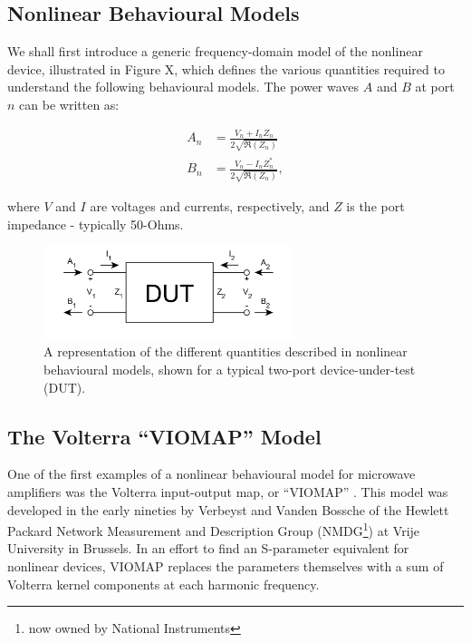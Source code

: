 \documentclass[../thesis/thesis.tex]{subfiles}
\begin{document}
\begin{refsection}
\section{Nonlinear Behavioural Models}

We shall first introduce a generic frequency-domain model of the nonlinear device, illustrated in Figure X, which defines the various quantities required to understand the following behavioural models. The power waves $A$ and $B$ at port $n$ can be written as:

\begin{align}
	A_n &= \frac{V_n + I_n Z_n}{2\sqrt{\Re(Z_n)}} \\
	B_n &= \frac{V_n - I_n Z^*_n}{2\sqrt{\Re(Z_n)}},
\end{align}

where $V$ and $I$ are voltages and currents, respectively, and $Z$ is the port impedance - typically 50-Ohms.

\begin{figure}
	\centering
	\includegraphics[width=0.65\textwidth]{dut}
	\caption[Device-under-test model representation.]{A representation of the different quantities described in nonlinear behavioural models, shown for a typical two-port device-under-test (DUT).}
	\label{ch5_fig_dut}
\end{figure}

\subsection{The Volterra ``VIOMAP'' Model}

One of the first examples of a nonlinear behavioural model for microwave amplifiers was the Volterra input-output map, or ``VIOMAP'' \cite{Verbeyst_1994}. This model was developed in the early nineties by Verbeyst and Vanden Bossche of the Hewlett Packard Network Measurement and Description Group (NMDG\footnote{now owned by National Instruments}) at Vrije University in Brussels. In an effort to find an S-parameter equivalent for nonlinear devices, VIOMAP replaces the parameters themselves with a sum of Volterra kernel components at each harmonic frequency\cite{Schetzen_2006, Moodi_2010}.


\end{refsection}
\end{document}
